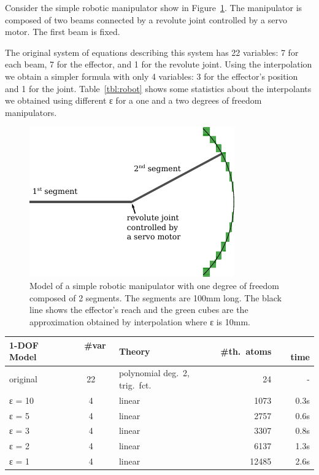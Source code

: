 \begin{example}
Consider the simple robotic manipulator show in Figure~\ref{fig:robot}.
The manipulator is composed of two beams connected by a revolute joint controlled by a servo motor.
The first beam is fixed.

The original system of equations describing this system has 22 variables: 7 for each beam, 7 for the effector, and 1 for the revolute joint.
Using the interpolation we obtain a simpler formula with only 4 variables: 3 for the effector's position and 1 for the joint.
Table~\ref{tbl:robot} shows some statistics about the interpolants we obtained using different ε for a one and a two degrees of freedom manipulators.


\begin{figure}
\centering
\includegraphics[scale=1]{img/arm.pdf}
\caption{
    Model of a simple robotic manipulator with one degree of freedom composed of 2 segments.
    The segments are 100mm long.
    The black line shows the effector's reach and the green cubes are the approximation obtained by interpolation where ε is 10mm.
}
\label{fig:robot}
\end{figure}

\begin{table}
\centering
\begin{tabular}{l|clrr}
1-DOF Model & ~ \#var  ~~ & Theory   & \#th.~atoms & ~~ time \\
\hline
\hline
original & 22 & polynomial deg.~2, trig.~fct.   & 24    & - \\
\hline
ε = 10   & 4  & linear                          & 1073  & 0.3s \\
ε = 5    & 4  & linear                          & 2757  & 0.6s \\
ε = 3    & 4  & linear                          & 3307  & 0.8s \\
ε = 2    & 4  & linear                          & 6137  & 1.3s \\
ε = 1    & 4  & linear                          & 12485 & 2.6s \\
\end{tabular}


\end{table}
\end{example}
